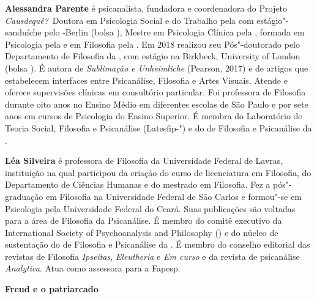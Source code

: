 \textbf{Alessandra Parente} é psicanalista, fundadora e coordenadora do
Projeto \emph{Causdequê?} Doutora em Psicologia Social e do Trabalho pela  com
estágio"-sanduíche pelo -Berlin (bolsa ), Mestre em Psicologia Clínica pela
, formada em Psicologia pela  e em Filosofia pela . Em 2018 realizou seu Pós"-doutorado pelo Departamento de Filosofia da , com estágio na
Birkbeck, University of London (bolsa ). É autora de
\emph{Sublimação e Unheimliche} (Pearson, 2017) e de artigos que estabelecem interfaces entre
Psicanálise, Filosofia e Artes Visuais. Atende e oferece supervisões clínicas em
consultório particular. Foi professora de Filosofia durante oito anos no Ensino Médio
em diferentes escolas de São Paulo e por sete anos em cursos de Psicologia do Ensino
Superior. É membra do Laboratório de Teoria Social, Filosofia e Psicanálise (Latesfip-") e do  de Filosofia e Psicanálise da .

\textbf{Léa Silveira} é professora de Filosofia da Universidade Federal de Lavras, instituição na
qual participou da criação do curso de licenciatura em Filosofia, do Departamento de
Ciências Humanas e do mestrado em Filosofia. Fez a pós"-graduação em Filosofia na
Universidade Federal de São Carlos e formou"-se em Psicologia pela Universidade
Federal do Ceará. Suas publicações são voltadas para a área de Filosofia da Psicanálise.
É membro do comitê executivo da International Society of Psychoanalysis and
Philosophy () e do núcleo de sustentação do  de Filosofia e Psicanálise da . É membro do conselho editorial das revistas de Filosofia \emph{Ipseitas}, \emph{Eleutheria} e \emph{Em curso} e da revista de psicanálise \emph{Analytica}. Atua como assessora para a Fapesp.

\textbf{Freud e o patriarcado} \lipsum[1]







